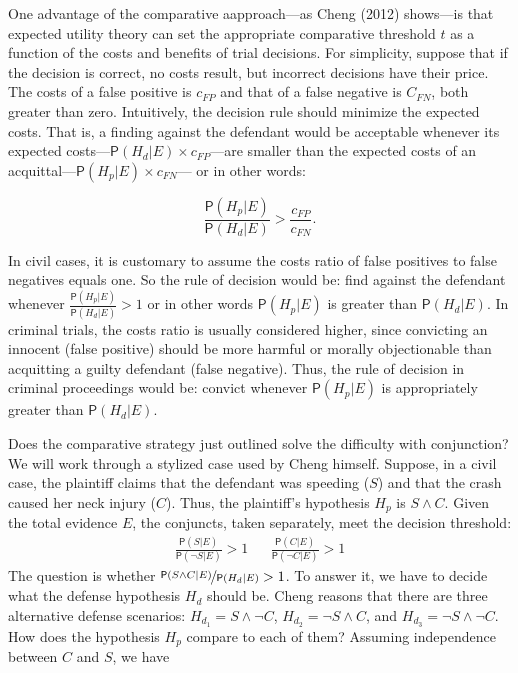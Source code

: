 \documentclass[
  10pt,
  dvipsnames,enabledeprecatedfontcommands]{scrartcl}
\newcommand{\n}{\neg}
\newcommand{\et}{\wedge}
\newcommand{\pr}[1]{\ensuremath{\mathsf{P}(#1)}}
\begin{document}
One advantage of the comparative aapproach---as Cheng (2012) shows---is
that expected utility theory can set the appropriate comparative
threshold \(t\) as a function of the costs and benefits of trial
decisions. For simplicity, suppose that if the decision is correct, no
costs result, but incorrect decisions have their price.
 The costs of a false positive is
\(c_{FP}\) and that of a false negative is \(C_{FN}\), both greater than
zero. Intuitively, the decision rule should minimize the expected costs.
That is, a finding against the defendant would be acceptable whenever
its expected costs---\(\pr{H_d \vert E} \times c_{FP}\)---are smaller
than the expected costs of an
acquittal---\(\pr{H_p \vert E}\times c_{FN}\)--- or in other words:

\[\frac{\pr{H_p \vert E}}{\pr{H_d \vert E}} > \frac{c_{FP}}{c_{FN}}.\]

\noindent In civil cases, it is customary to assume the costs ratio of
false positives to false negatives equals one. So the rule of decision
would be: find against the defendant whenever
\(\frac{\pr{H_p \vert E}}{\pr{H_d \vert E}} > 1\) or in other words
\(\pr{H_p \vert E}\) is greater than \(\pr{H_d \vert E}\). In criminal
trials, the costs ratio is usually considered higher, since convicting
an innocent (false positive) should be more harmful or morally
objectionable than acquitting a guilty defendant (false negative). Thus,
the rule of decision in criminal proceedings would be: convict whenever
\(\pr{H_p \vert E}\) is appropriately greater than \(\pr{H_d \vert E}\).

Does the comparative strategy just outlined solve the difficulty with
conjunction? We will work through a stylized case used by Cheng himself.
Suppose, in a civil case, the plaintiff claims that the defendant was
speeding (\(S\)) and that the crash caused her neck injury (\(C\)).
Thus, the plaintiff's hypothesis \(H_p\) is \(S\et C\). Given the total
evidence \(E\), the conjuncts, taken separately, meet the decision
threshold: \begin{align}
 \nonumber 
 \frac{\pr{S\vert E}}{\pr{\neg S \vert E}} > 1   & & \frac{\pr{C\vert E}}{\pr{\neg C \vert E}} > 1
\end{align} \noindent The question is whether
\(\nicefrac{\pr{S\et C\vert E}}{\pr{H_d \vert E}}>1\). To answer it, we
have to decide what the defense hypothesis \(H_d\) should be. Cheng
reasons that there are three alternative defense scenarios:
\(H_{d_1}= S\et \n C\), \(H_{d_2}=\n S \et C\), and
\(H_{d_3}=\n S \et \n C\). How does the hypothesis \(H_p\) compare to
each of them? Assuming independence between \(C\) and \(S\), we have
\end{document}
